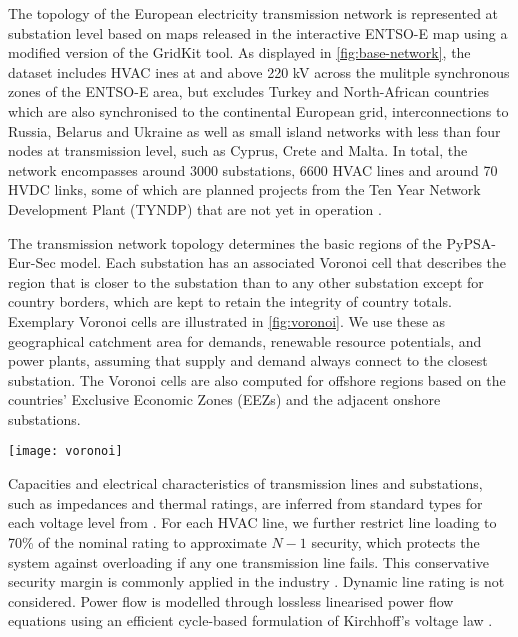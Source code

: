 
The topology of the European electricity transmission network is represented at
substation level based on maps released in the interactive ENTSO-E map \citeS{}
using a modified version of the GridKit \citeS{} tool. As displayed in
\cref{fig:base-network}, the dataset includes HVAC ines at and above 220 kV
across the mulitple synchronous zones of the ENTSO-E area, but excludes Turkey
and North-African countries which are also synchronised to the continental
European grid, interconnections to Russia, Belarus and Ukraine as well as small
island networks with less than four nodes at transmission level, such as Cyprus,
Crete and Malta. In total, the network encompasses around 3000 substations, 6600
HVAC lines and around 70 HVDC links, some of which are planned projects from the
Ten Year Network Development Plant (TYNDP) that are not yet in operation
\citeS{}.


The transmission network topology determines the basic regions of the
PyPSA-Eur-Sec model. Each substation has an associated Voronoi cell that
describes the region that is closer to the substation than to any other
substation except for country borders, which are kept to retain the integrity of
country totals. Exemplary Voronoi cells are illustrated in \cref{fig:voronoi}.
We use these as geographical catchment area for demands, renewable resource
potentials, and power plants, assuming that supply and demand always connect to
the closest substation. The Voronoi cells are also computed for offshore regions
based on the countries' Exclusive Economic Zones (EEZs) and the adjacent onshore
substations.

\begin{SCfigure}
    \caption{Exemplary Voronoi cells of the transmission network's substations.}
    \texttt{[image: voronoi]}
    \label{fig:voronoi}
\end{SCfigure}


Capacities and electrical characteristics of transmission lines and substations,
such as impedances and thermal ratings, are
inferred from standard types for each voltage level from \citeS{}. For each HVAC
line, we further restrict line loading to 70\% of the nominal rating to
approximate $N-1$ security, which protects the system against overloading if any
one transmission line fails. This conservative security margin is commonly
applied in the industry \citeS{}. Dynamic line rating is not considered. Power
flow is modelled through lossless linearised power flow equations using an
efficient cycle-based formulation of Kirchhoff's voltage law
.

